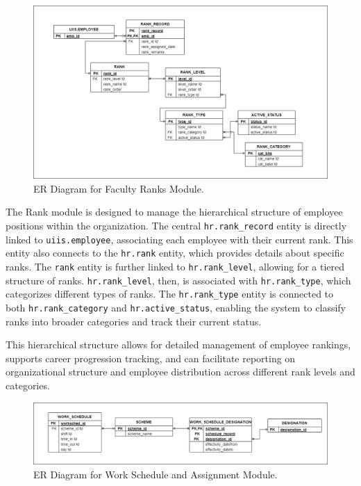     \begin{figure}[H]
        \centering
        \includegraphics[width=1\linewidth]{figures/images/diagrams/erd/erd-core-rank.png}
        \caption{ER Diagram for Faculty Ranks Module.}
        \label{fig:erd-core-rank}
    \end{figure}

    The Rank module is designed to manage the hierarchical structure of employee positions within the organization. The central \texttt{hr.rank\_record} entity is directly linked to \texttt{uiis.employee}, associating each employee with their current rank. This entity also connects to the \texttt{hr.rank} entity, which provides details about specific ranks. The \texttt{rank} entity is further linked to \texttt{hr.rank\_level}, allowing for a tiered structure of ranks. \texttt{hr.rank\_level}, then, is associated with \texttt{hr.rank\_type}, which categorizes different types of ranks. The \texttt{hr.rank\_type} entity is connected to both \texttt{hr.rank\_category} and \texttt{hr.active\_status}, enabling the system to classify ranks into broader categories and track their current status. 
            
    This hierarchical structure allows for detailed management of employee rankings, supports career progression tracking, and can facilitate reporting on organizational structure and employee distribution across different rank levels and categories.
    
    \begin{figure}[H]
        \centering
        \includegraphics[width=1\linewidth]{figures/images/diagrams/erd/erd-timesys-work-schedule-scheme-and-assignment.png}
        \caption{ER Diagram for Work Schedule and Assignment Module.}
        \label{fig:erd-timesys-work-schedule-scheme-and-assignment}
    \end{figure}

